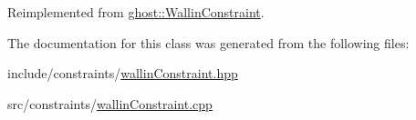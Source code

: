 Reimplemented from \hyperlink{classghost_1_1WallinConstraint_af2d6f103c844a14745b7de6c656f9981}{ghost\-::\-Wallin\-Constraint}.



The documentation for this class was generated from the following files\-:\begin{DoxyCompactItemize}
\item 
include/constraints/\hyperlink{wallinConstraint_8hpp}{wallin\-Constraint.\-hpp}\item 
src/constraints/\hyperlink{wallinConstraint_8cpp}{wallin\-Constraint.\-cpp}\end{DoxyCompactItemize}
